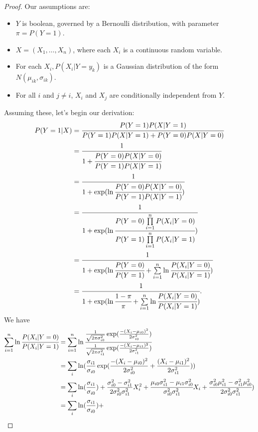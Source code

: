 \documentclass[12pt]{article}
\begin{document}
\begin{proof}
  Our assumptions are:
  \begin{itemize}
  \item
    $Y$ is boolean, governed by a Bernoulli distribution, with parameter $\pi = P(Y = 1)$.
  \item
    $X = (X_1, \dots, X_n)$, where each $X_i$ is a continuous random variable.
  \item
    For each $X_i, P(X_i | Y=y_k)$ is a Gaussian distribution of the form $N(\mu_{ik}, \sigma_{ik})$.
  \item
    For all $i$ and $j \neq i$, $X_i$ and $X_j$ are conditionally independent from $Y$.
  \end{itemize}
  Assuming these, let's begin our derivation:
  \begin{align}
    P(Y=1|X)
    &= \cfrac{P(Y=1)P(X|Y=1)}{P(Y=1)P(X|Y=1) + P(Y=0)P(X|Y=0)} \\
    &= \cfrac{1}{1 + \cfrac{P(Y=0)P(X|Y=0)}{P(Y=1)P(X|Y=1)}} \\
    &= \cfrac{1}{1+\exp(\ln\cfrac{P(Y=0)P(X|Y=0)}{P(Y=1)P(X|Y=1)})} \\
    &= \cfrac{1}{1+\exp(\ln\cfrac{P(Y=0)\prod\limits_{i=1}^nP(X_i|Y=0)}{P(Y=1)\prod\limits_{i=1}^nP(X_i|Y=1)})} \\
    &= \cfrac{1}{1+\exp(\ln\cfrac{P(Y=0)}{P(Y=1)} + \sum\limits_{i=1}^n\ln\cfrac{P(X_i|Y=0)}{P(X_i|Y=1)})} \\
    &= \cfrac{1}{1+\exp(\ln\cfrac{1-\pi}{\pi} + \sum\limits_{i=1}^n\ln\cfrac{P(X_i|Y=0)}{P(X_i|Y=1)})}.
  \end{align}
  We have
  \begin{align*}
    \sum\limits_{i=1}^n\ln\cfrac{P(X_i|Y=0)}{P(X_i|Y=1)}
    &= \sum\limits_{i=1}^n\ln
    \cfrac{\frac{1}{\sqrt{2\pi\sigma_{i0}^2}}\exp(\frac{-(X_i-\mu_{i0})^2}{2\sigma_{i0}^2})}{\frac{1}{\sqrt{2\pi\sigma_{i1}^2}}\exp(\frac{-(X_i-\mu_{i1})^2}{2\sigma_{i1}^2})} \\
    &= \sum\limits_i \ln(\frac{\sigma_{i1}}{\sigma_{i0}}\exp(\frac{-(X_i-\mu_{i0})^2}{2\sigma_{i0}^2} + \frac{(X_i-\mu_{i1})^2}{2\sigma_{i1}^2})) \\
    &=\sum\limits_i \ln(\frac{\sigma_{i1}}{\sigma_{i0}}) +
    \frac{\sigma_{i0}^2-\sigma_{i1}^2}{2\sigma_{i0}^2\sigma_{i1}^2}X_i^2 + \cfrac{\mu_{i0}\sigma_{i1}^2-\mu_{i1}\sigma_{i0}^2}{\sigma_{i0}^2\sigma_{i1}^2}X_i +
    \cfrac{\sigma_{i0}^2\mu_{i1}^2 - \sigma_{i1}^2\mu_{i0}^2}{2\sigma_{i0}^2\sigma_{i1}^2}) \\
    &=\sum\limits_i \ln(\frac{\sigma_{i1}}{\sigma_{i0}}) +

\end{align*}
\end{proof}
\end{document}
